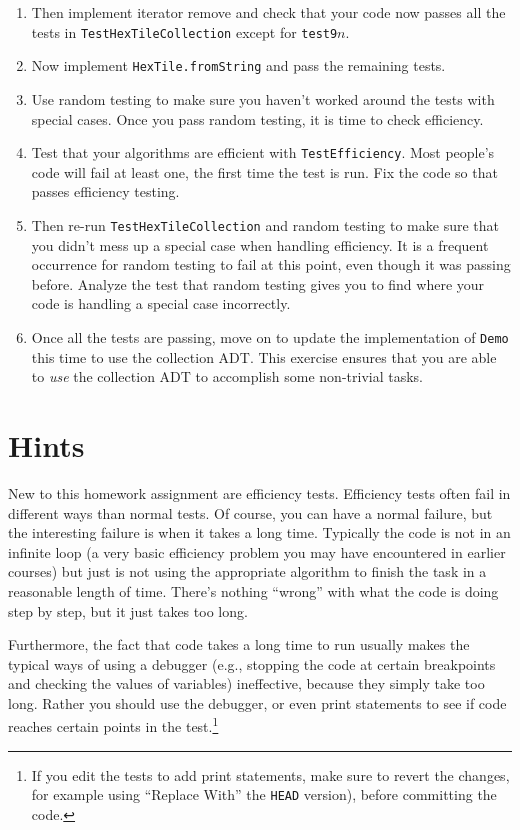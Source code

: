 \documentclass[11pt]{article}
\begin{document}
\begin{enumerate}
\item Then implement iterator remove and check that your code now
  passes all the tests in \texttt{TestHexTileCollection} except for
  \texttt{test9}$n$.

\item Now implement \texttt{HexTile.fromString} and pass the remaining tests.
  
\item Use random testing to make sure you haven't worked around
  the tests with special cases.  Once you pass random testing, it
  is time to check efficiency.
  
\item Test that your algorithms are efficient with
  \texttt{TestEfficiency}.  Most people's code will fail at least one, the
  first time the test is run.  Fix the code so that passes efficiency
  testing.

\item Then re-run \texttt{TestHexTileCollection} and random testing to
  make sure that you didn't mess up
  a special case when handling efficiency.  It is a frequent occurrence
  for random testing to fail at this point, even though it was passing
  before.  Analyze the test that random testing gives you to find
  where your code is handling a special case incorrectly.
  
\item Once all the tests are passing, move on to update the
  implementation of \texttt{Demo} this time to use the collection
  ADT.  This exercise ensures that you are able to \emph{use} the
  collection ADT to accomplish some non-trivial tasks.
\end{enumerate}  

\section{Hints}

New to this homework assignment are efficiency tests.
Efficiency tests often fail in different ways than normal tests.  Of
course, you can have a normal failure, but the interesting failure is
when it takes a long time.  Typically the code is not in an infinite
loop (a very basic efficiency problem you may have encountered in
earlier courses) but just is not using the appropriate algorithm to
finish the task in a reasonable length of time.  There's nothing
``wrong'' with what the code is doing step by step, but it just
takes too long.

Furthermore, the fact that code takes a long time to run usually makes
the typical ways of using a debugger (e.g., stopping the code at certain
breakpoints and checking the values of variables) ineffective,
because they simply take too long.
Rather you should use the debugger, or even print statements to see if
code reaches certain points in the test.\footnote{If you edit the
  tests to add print statements, make sure to revert the changes, for
  example using ``Replace With'' the \texttt{HEAD} version), before
  committing the code.}
\end{document}
